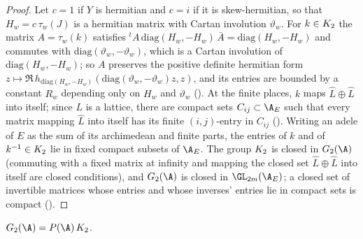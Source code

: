 \begin{proof}
Let $c=1$ if $Y$ is hermitian and $c=i$ if it is skew-hermitian, so that $H_w=c\,\tau_w(J)$ is a hermitian
matrix with Cartan involution $\vartheta_w$. For $k\in K_2$ the matrix $A=\tau_w(k)$ satisfies
${}^tA\,\mathrm{diag}(H_w,-H_w)\,\bar A=\mathrm{diag}(H_w,-H_w)$ and commutes with $\mathrm{diag}(\vartheta_w,-\vartheta_w)$, which is a
Cartan involution of $\mathrm{diag}(H_w,-H_w)$; so $A$ preserves the positive definite hermitian form
$z\mapsto\Re\,h_{\mathrm{diag}(H_w,-H_w)}(\mathrm{diag}(\vartheta_w,-\vartheta_w)z,z)$, and its entries are bounded by a constant
$R_w$ depending only on $H_w$ and $\vartheta_w$ (). At the finite
places, $k$ maps $\widehat L\oplus\widehat L$ into itself; since $L$ is a lattice, there are compact sets
$C_{ij}\subset\tliftAE$ such that every matrix mapping $\widehat L$ into itself has its finite $(i,j)$-entry in
$C_{ij}$ (). Writing an adele of $E$ as the sum of its archimedean
and finite parts, the entries of $k$ and of $k^{-1}\in K_2$ lie in fixed compact subsets of $\tliftAE$. The
group $K_2$ is closed in $G_2(\A)$ (commuting with a fixed matrix at infinity and mapping the closed set
$\widehat L\oplus\widehat L$ into itself are closed conditions), and $G_2(\A)$ is closed in
$\GL_{2m}(\tliftAE)$; a closed set of invertible matrices whose entries and whose inverses' entries lie in
compact sets is compact ().
\end{proof}

\begin{proposition}\label{pf:tlift:iwasawa}
$G_2(\A)=P(\A)\,\tliftK$.
\end{proposition}

